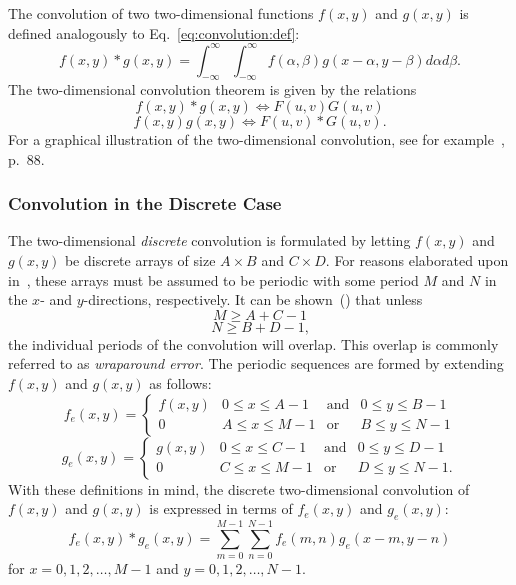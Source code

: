 The convolution of two two-dimensional functions $f(x,y)$ and $g(x,y)$
is defined analogously to Eq.~\ref{eq:convolution:def}:
\begin{equation}
  f(x,y)\ast g(x,y)=\int_{-\infty}^{\infty}\int_{-\infty}^{\infty}
  f(\alpha,\beta)g(x-\alpha,y-\beta)d\alpha d\beta\mbox{.}
\end{equation}
The two-dimensional convolution theorem is given by the relations
\begin{equation}
\label{eq:convolution:2Da}
  f(x,y)\ast g(x,y)\Leftrightarrow F(u,v)G(u,v)
\end{equation}
\begin{equation}
\label{eq:convolution:2Db}
  f(x,y)g(x,y)\Leftrightarrow F(u,v)\ast G(u,v)\mbox{.}
\end{equation}
For a graphical illustration of the two-dimensional convolution, see
for example~\cite{digim}, p.\ 88.

\subsubsection{Convolution in the Discrete Case}

The two-dimensional {\em discrete\/} convolution is formulated by
letting $f(x,y)$ and $g(x,y)$ be discrete arrays of size $A\times B$
and $C\times D$.  For reasons elaborated upon in~\cite{brigham}, these
arrays must be assumed to be periodic with some period $M$ and $N$ in
the $x$- and $y$-directions, respectively.  It can be
shown~(\cite{brigham}) that unless
\begin{equation}
  M\geq A+C-1
\end{equation}
\begin{equation}
  N\geq B+D-1\mbox{,}
\end{equation}
the individual periods of the convolution will overlap.  This overlap
is commonly referred to as {\em wraparound error\/}.  The periodic
sequences are formed by extending $f(x,y)$ and $g(x,y)$ as follows:
\begin{equation}
  f_{e}(x,y)=\left\{
    \begin{array}{llll}
      f(x,y) & 0\leq x\leq A-1 & \mbox{and} & 0\leq y\leq B-1 \\
      0      & A\leq x\leq M-1 & \mbox{or}  & B\leq y\leq N-1
    \end{array} \right.
\end{equation}
\begin{equation}
  g_{e}(x,y)=\left\{
    \begin{array}{llll}
      g(x,y) & 0\leq x\leq C-1 & \mbox{and} & 0\leq y\leq D-1 \\
      0      & C\leq x\leq M-1 & \mbox{or}  & D\leq y\leq N-1\mbox{.}
    \end{array} \right.
\end{equation}
With these definitions in mind, the discrete two-dimensional
convolution of $f(x,y)$ and $g(x,y)$ is expressed in terms of
$f_{e}(x,y)$ and $g_{e}(x,y)$:
\begin{equation}
\label{eq:convolution:discrete}
  f_{e}(x,y)\ast g_{e}(x,y)=\sum_{m=0}^{M-1}\sum_{n=0}^{N-1}
  f_{e}(m,n)g_{e}(x-m,y-n)
\end{equation}
for $x=0,1,2,\ldots,M-1$ and $y=0,1,2,\ldots,N-1$.

